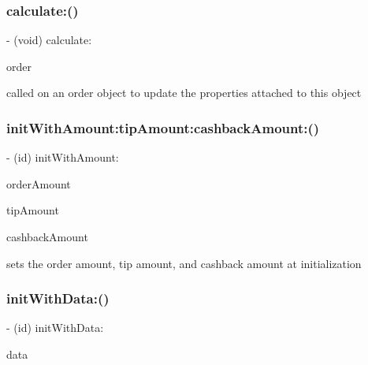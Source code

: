 \subsubsection{\texorpdfstring{calculate\+:()}{calculate:()}}
{\footnotesize\ttfamily -\/ (void) calculate\+: \begin{DoxyParamCaption}\item[{(\hyperlink{interface_poynt_order_object}{Poynt\+Order\+Object} $\ast$)}]{order }\end{DoxyParamCaption}}



called on an order object to update the properties attached to this object 

\hypertarget{interface_poynt_transaction_amounts_af1bc93b54ea2b50650a15f84ced4f921}{}\label{interface_poynt_transaction_amounts_af1bc93b54ea2b50650a15f84ced4f921} 
\subsubsection{\texorpdfstring{init\+With\+Amount\+:tip\+Amount\+:cashback\+Amount\+:()}{initWithAmount:tipAmount:cashbackAmount:()}}
{\footnotesize\ttfamily -\/ (id) init\+With\+Amount\+: \begin{DoxyParamCaption}\item[{(N\+S\+Integer)}]{order\+Amount }\item[{tipAmount:(N\+S\+Integer)}]{tip\+Amount }\item[{cashbackAmount:(N\+S\+Integer)}]{cashback\+Amount }\end{DoxyParamCaption}}



sets the order amount, tip amount, and cashback amount at initialization 

\hypertarget{interface_poynt_transaction_amounts_ac4a96ce3f50982e0f88ef099c2b3dc5b}{}\label{interface_poynt_transaction_amounts_ac4a96ce3f50982e0f88ef099c2b3dc5b} 
\subsubsection{\texorpdfstring{init\+With\+Data\+:()}{initWithData:()}}
{\footnotesize\ttfamily -\/ (id) init\+With\+Data\+: \begin{DoxyParamCaption}\item[{(N\+S\+Dictionary $\ast$)}]{data }\end{DoxyParamCaption}}



